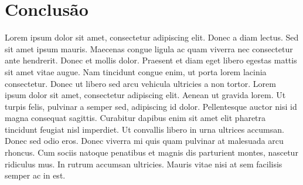 \documentclass{article}
\begin{document}
\section{Conclusão}

Lorem ipsum dolor sit amet, consectetur adipiscing elit. Donec a diam lectus. Sed sit amet ipsum mauris. Maecenas congue ligula ac quam viverra nec consectetur ante hendrerit. Donec et mollis dolor. Praesent et diam eget libero egestas mattis sit amet vitae augue. Nam tincidunt congue enim, ut porta lorem lacinia consectetur. Donec ut libero sed arcu vehicula ultricies a non tortor. Lorem ipsum dolor sit amet, consectetur adipiscing elit. Aenean ut gravida lorem. Ut turpis felis, pulvinar a semper sed, adipiscing id dolor. Pellentesque auctor nisi id magna consequat sagittis. Curabitur dapibus enim sit amet elit pharetra tincidunt feugiat nisl imperdiet. Ut convallis libero in urna ultrices accumsan. Donec sed odio eros. Donec viverra mi quis quam pulvinar at malesuada arcu rhoncus. Cum sociis natoque penatibus et magnis dis parturient montes, nascetur ridiculus mus. In rutrum accumsan ultricies. Mauris vitae nisi at sem facilisis semper ac in est.

\printbibliography[heading=subbibliography,title={Bibliografia},type=book] \printbibliography[heading=subbibliography,title={Desenhos},type=artwork]
\end{document}
